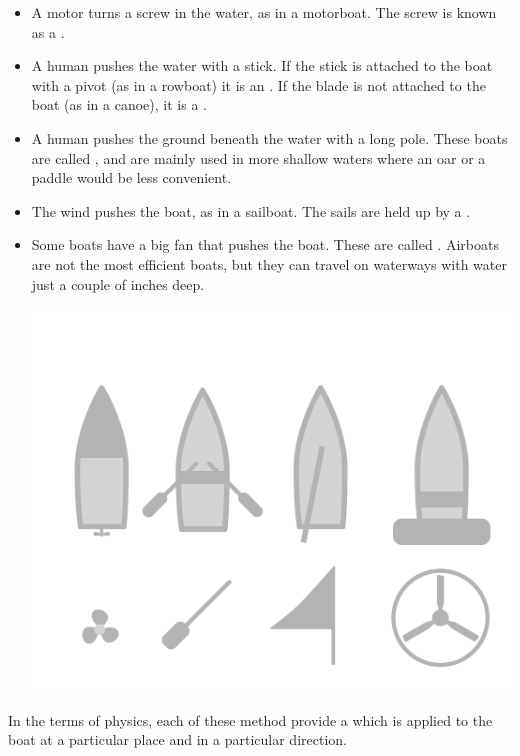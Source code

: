 \begin{itemize}


\item A motor turns a screw in the water, as in a motorboat. The screw is known as a .

\item A human pushes the water with a stick.  If the stick is attached to the boat with a pivot (as in a rowboat) it is an .  If the blade is not attached to the boat (as in a canoe), it is a .

\item A human pushes the ground beneath the water with a long pole. These boats are called , and are mainly used in more shallow waters where an oar or a paddle would be less convenient.

\item The wind pushes the boat,  as in a sailboat. The sails are held up by a .

\item Some boats have a big fan that pushes the boat.  These are called .   Airboats are not the most efficient boats,  but they can travel
on waterways with water just a couple of inches deep.

\begin{center}
    \includegraphics[width=.75\textwidth]{boatTypes.png}
    
\end{center}

\end{itemize}

In the terms of physics, each of these method provide a  which is applied to the boat at a particular place and in a particular direction.

